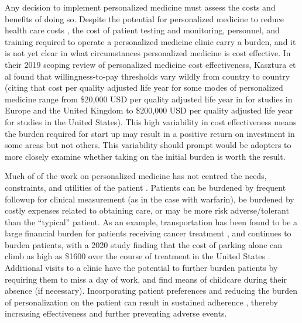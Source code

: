 Any decision to implement personalized medicine must assess the costs and benefits of doing so. Despite the potential for personalized medicine to reduce health care costs \cite{looff2016economic,shabaruddin2015economic}, the cost of patient testing and monitoring, personnel, and training required to operate a personalized medicine clinic carry a burden, and it is not yet clear in what circumstances personalized medicine is cost effective.  In their 2019 scoping review of personalized medicine cost effectiveness, Kasztura et al \cite{kasztura2019cost} found that willingness-to-pay thresholds vary wildly from country to country (citing that cost per quality adjusted life year for some modes of personalized medicine range from \$20,000 USD per quality adjusted life year in for studies in Europe and the United Kingdom to \$200,000 USD per quality adjusted life year for studies in the United States).  This high variability in cost effectiveness means the burden required for start up may result in a positive return on investment in some areas but not others. This variability should prompt would be adopters to more closely examine whether taking on the initial burden is worth the result.

Much of of the work on personalized medicine has not centred the needs, constraints, and utilities of the patient \cite{rogowski2015concepts, di2017personalized}. Patients can be burdened by frequent followup for clinical measurement (as in the case with warfarin), be burdened by costly expenses related to obtaining care, or may be more risk adverse/tolerant than the ``typical'' patient. As an example, transportation has been found to be a large financial burden for patients receiving cancer treatment \cite{houts1984nonmedical}, and continues to burden patients, with a 2020 study finding that the cost of parking alone can climb as high as \$1600 over the course of treatment in the United States \cite{lee2020assessment}.  Additional visits to a clinic have the potential to further burden patients by requiring them to miss a day of work, and find means of childcare during their absence (if necessary). Incorporating patient preferences and reducing the burden of personalization on the patient can result in sustained adherence \cite{elliott2008understanding}, thereby increasing effectiveness and further preventing adverse events.

